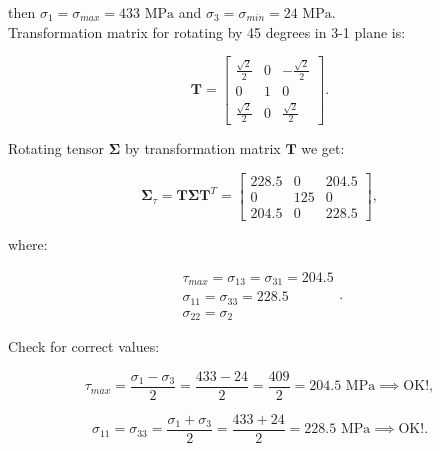 \documentclass[10pt,b5paper,titlepage]{book}
\begin{document}
\begin{itemize}
        then $\sigma_1 = \sigma_{max} = 433 \text{ MPa}$ and
        $\sigma_3 = \sigma_{min} = 24 \text{ MPa}$.\\

        Transformation matrix for rotating by 45 degrees in 3-1 plane is:

        \begin{equation}
            \mathbf{T} = \begin{bmatrix}
                \frac{\sqrt{2}}{2} & 0 & -\frac{\sqrt{2}}{2} \\
                0 & 1 & 0 \\
                \frac{\sqrt{2}}{2} & 0 & \frac{\sqrt{2}}{2}
            \end{bmatrix}
        .\end{equation}

        Rotating tensor $\mathbf{\Sigma}$ by transformation matrix $\mathbf{T}$ we get:

        \begin{equation}
            \mathbf{\Sigma}_{\tau} = \mathbf{T}\mathbf{\Sigma}\mathbf{T}^{T}
            = \begin{bmatrix}
                228.5 & 0 & 204.5 \\
                0 & 125 & 0 \\
                204.5 & 0 & 228.5
            \end{bmatrix}
        ,\end{equation}

        where:

        \begin{equation}
            \begin{array}{l}
                \tau_{max} = \sigma_{13} = \sigma_{31} = 204.5 \\
                \sigma_{11} = \sigma_{33} = 228.5 \\
                \sigma_{22} = \sigma_2
            \end{array}
        .\end{equation}

        Check for correct values:

        \begin{equation}
            \tau_{max} = \frac{\sigma_1 - \sigma_3}{2} = \frac{433 - 24}{2}
            = \frac{409}{2} = 204.5 \text{ MPa} \implies \text{OK!}
        ,\end{equation}

        \begin{equation}
            \sigma_{11} = \sigma_{33} = \frac{\sigma_1 + \sigma_3}{2}
            = \frac{433 + 24}{2} = 228.5 \text{ MPa} \implies \text{OK!}
        .\end{equation}


\end{itemize}
\end{document}
